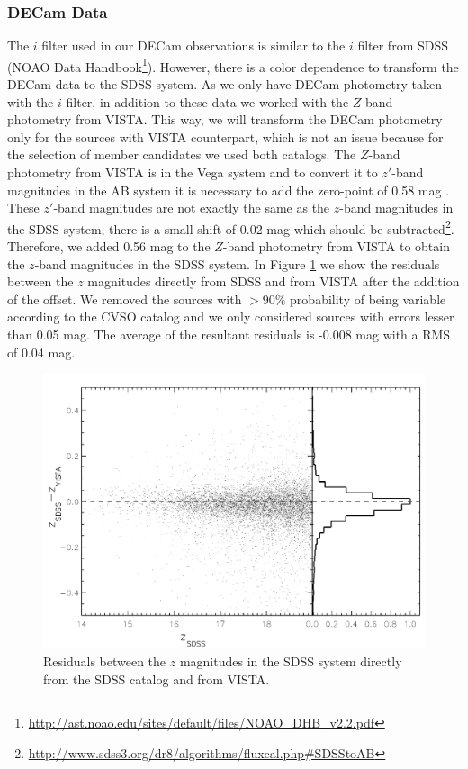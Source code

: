 \documentclass[12pt]{article}
\begin{document}
\subsubsection{DECam Data}
The $i$ filter used in our DECam observations is similar to the $i$ filter from SDSS (NOAO Data Handbook\footnote{\url{http://ast.noao.edu/sites/default/files/NOAO\_DHB\_v2.2.pdf}}). However, there is a color dependence to transform the DECam data to the SDSS system. As we only have DECam photometry taken with the $i$ filter, in addition to these data we worked with the $Z$-band photometry from VISTA. This way, we will transform the DECam photometry only for the sources with VISTA counterpart, which is not an issue because for the selection of member candidates we used both catalogs. The $Z$-band photometry from VISTA is in the Vega system and to convert it to $z'$-band magnitudes in the AB system it is necessary to add the zero-point of 0.58 mag \citep{Pickles2010}. These $z'$-band magnitudes are not exactly the same as the $z$-band magnitudes in the SDSS system, there is a small shift of 0.02 mag which should be subtracted\footnote{\url{http://www.sdss3.org/dr8/algorithms/fluxcal.php\#SDSStoAB}}. Therefore, we added 0.56 mag to the $Z$-band photometry from VISTA to obtain the $z$-band magnitudes in the SDSS system. In Figure \ref{fig_IMF:trasformation_VISTA} we show the residuals between the $z$ magnitudes directly from SDSS and from VISTA after the addition of the offset. We removed the sources with $>90\%$ probability of being variable according to the CVSO catalog and we only considered sources with errors lesser than 0.05 mag. The average of the resultant residuals is -0.008 mag with a RMS of 0.04 mag.

\begin{figure}[ht!]
	\begin{minipage}{0.60\textwidth}
		\includegraphics[width=1.00\textwidth]{f_B3.pdf}
	\end{minipage} \hfill
	\begin{minipage}{0.35\textwidth}
		\caption[$Z$ magnidutes from VISTA in the SDSS system.]{Residuals between the $z$ magnitudes in the SDSS system directly from the SDSS catalog and from VISTA.}
		\label{fig_IMF:trasformation_VISTA}
	\end{minipage}
\end{figure}
\end{document}
